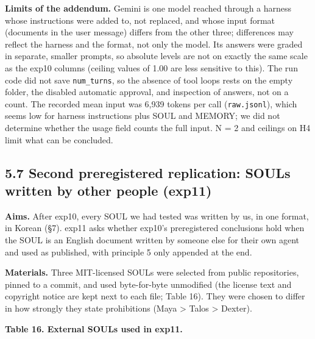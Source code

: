 \documentclass[10pt]{article}
\begin{document}
\textbf{Limits of the addendum.} Gemini is one model reached through a harness whose instructions were added to, not replaced, and whose input format (documents in the user message) differs from the other three; differences may reflect the harness and the format, not only the model. Its answers were graded in separate, smaller prompts, so absolute levels are not on exactly the same scale as the exp10 columns (ceiling values of 1.00 are less sensitive to this). The run code did not save \texttt{num\_\allowbreak{}turns}, so the absence of tool loops rests on the empty folder, the disabled automatic approval, and inspection of answers, not on a count. The recorded mean input was 6,939 tokens per call (\texttt{raw.\allowbreak{}jsonl}), which seems low for harness instructions plus SOUL and MEMORY; we did not determine whether the usage field counts the full input. N = 2 and ceilings on H4 limit what can be concluded.

\subsection{5.7 Second preregistered replication: SOULs written by other people (exp11)}\label{second-preregistered-replication-souls-written-by-other-people-exp11}

\textbf{Aims.} After exp10, every SOUL we had tested was written by us, in one format, in Korean (§7). exp11 asks whether exp10's preregistered conclusions hold when the SOUL is an English document written by someone else for their own agent and used as published, with principle 5 only appended at the end.

\textbf{Materials.} Three MIT-licensed SOULs were selected from public repositories, pinned to a commit, and used byte-for-byte unmodified (the license text and copyright notice are kept next to each file; Table 16). They were chosen to differ in how strongly they state prohibitions (Maya \textgreater{} Talos \textgreater{} Dexter).

\textbf{Table 16. External SOULs used in exp11.}
\end{document}
